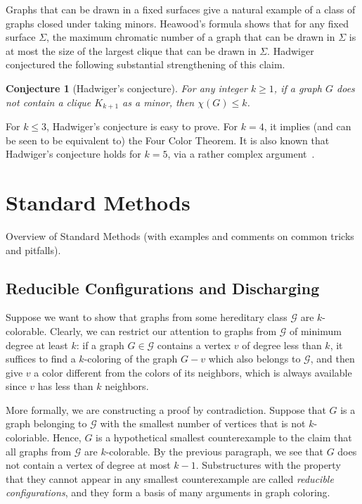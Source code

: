 \documentclass[12pt,twoside,openright,a4paper]{book}
\newtheorem{conjecture}{Conjecture}[chapter]
\newcommand{\GG}{\mathcal{G}}
\begin{document}
Graphs that can be drawn in a fixed surfaces give a natural example of a class of graphs closed under taking minors.
Heawood's formula shows that for any fixed surface $\Sigma$, the maximum chromatic number of a graph that can be drawn in
$\Sigma$ is at most the size of the largest clique that can be drawn in $\Sigma$.  Hadwiger conjectured the following
substantial strengthening of this claim.

\begin{conjecture}[Hadwiger's conjecture]
For any integer $k\ge 1$, if a graph $G$ does not contain a clique $K_{k+1}$ as a minor, then $\chi(G)\le k$.
\end{conjecture}

For $k\le 3$, Hadwiger's conjecture is easy to prove.  For $k=4$, it implies (and can be seen to be equivalent to)
the Four Color Theorem.  It is also known that Hadwiger's conjecture holds for $k=5$, via a rather complex argument~\cite{robertsonseymourthomas}.

\part{Standard Methods}

Overview of Standard Methods (with examples and comments on common tricks and pitfalls).

\chapter{Reducible Configurations and Discharging}\label{chap:redu}

Suppose we want to show that graphs from some hereditary class $\GG$ are $k$-colorable.  Clearly, we can
restrict our attention to graphs from $\GG$ of minimum degree at least $k$: if a graph $G\in \GG$
contains a vertex $v$ of degree less than $k$, it suffices to find a $k$-coloring of the graph $G-v$
which also belongs to $\GG$, and then give $v$ a color different from the colors of its neighbors,
which is always available since $v$ has less than $k$ neighbors.

More formally, we are constructing a proof by contradiction.  Suppose that $G$ is a graph belonging to $\GG$
with the smallest number of vertices that is not $k$-coloriable.  Hence, $G$ is a hypothetical smallest counterexample
to the claim that all graphs from $\GG$ are $k$-colorable.
By the previous paragraph, we see that $G$ does not contain a vertex of degree at most $k-1$.
Substructures with the property that they cannot appear in any smallest counterexample
are called \emph{reducible configurations}, and they form a basis of many arguments in graph coloring.
\end{document}

